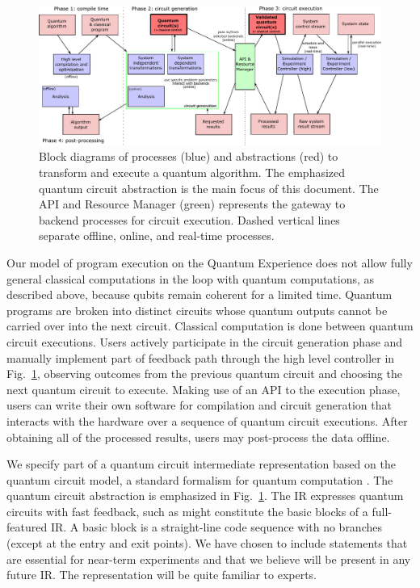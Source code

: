 \documentclass[USenglish,12pt,fleqn]{article} %
\begin{document}
\begin{figure}[h]
\hspace{-0.2cm}
\includegraphics[width=17cm]{figs/blocks.pdf}
\caption{Block diagrams of processes (blue) and abstractions (red) to transform and execute a quantum algorithm. The emphasized quantum circuit abstraction is the main focus of this document. The API and Resource Manager (green) represents the gateway to backend processes for circuit execution. Dashed vertical lines separate offline, online, and real-time processes.
\label{fig:diagram}}
\end{figure}

Our model of program execution on the Quantum Experience does not allow fully general classical computations in the loop with quantum computations, as described above, because qubits remain coherent for a limited time. Quantum programs are broken into distinct circuits whose quantum outputs cannot be carried over into the next circuit. Classical computation is done between quantum circuit executions. Users actively participate in the circuit generation phase and manually implement part of feedback path through the high level controller in Fig.~\ref{fig:diagram}, observing outcomes from the previous quantum circuit and choosing the next quantum circuit to execute. Making use of an API to the execution phase, users can write their own software for compilation and circuit generation that interacts with the hardware over a sequence of quantum circuit executions. After obtaining all of the processed results, users may post-process the data offline.

We specify part of a quantum circuit intermediate representation based on the quantum circuit model, a standard formalism for quantum computation \cite{NC00}. The quantum circuit abstraction is emphasized in Fig.~\ref{fig:diagram}. The IR expresses quantum circuits with fast feedback, such as might constitute the basic blocks of a full-featured IR. A basic block is a straight-line code sequence with no branches (except at the entry and exit points). We have chosen to include statements that are essential for near-term experiments and that we believe will be present in any future IR. The representation will be quite familiar to experts.
\end{document}
